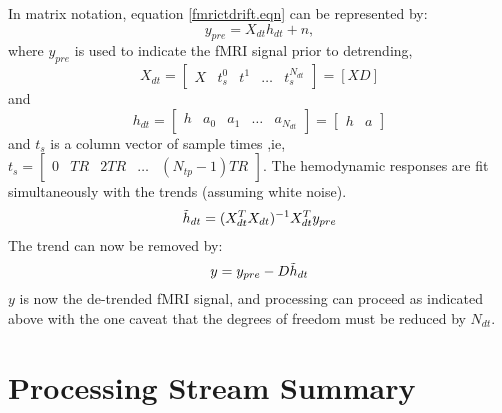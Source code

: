 \documentclass[12pt]{article}
\begin{document}
In matrix notation, equation \ref{fmrictdrift.eqn} can be represented
by:
\begin{equation}
y_{pre} = X_{dt} h_{dt} + n,
\end{equation}
where $y_{pre}$ is used to indicate the fMRI signal prior to
detrending, 
\begin{equation}
X_{dt} =  
\begin{bmatrix} X & t_s^0 & t^1 & \ldots & t_s^{N_{dt}} \end{bmatrix} 
= [X D]
\end{equation}
and
\begin{equation}
h_{dt} = \begin{bmatrix} h & a_0 & a_1 & \ldots &  a_{N_{dt}}
\end{bmatrix} = 
\begin{bmatrix}
h & a
\end{bmatrix}
\end{equation}
and $t_s$ is a column vector of sample times ,ie, 
$t_s = \begin{bmatrix}
  0 & TR & 2TR & \ldots & (N_{tp}-1)TR
\end{bmatrix}$.
The hemodynamic responses are fit
simultaneously with the trends (assuming white noise).
\begin{equation}
\Tilde{h}_{dt} = (X_{dt}^T X_{dt})^{-1} X_{dt}^T y_{pre} 
\end{equation}
The trend can now be removed by:
\begin{equation}
y = y_{pre} - D \Tilde{h}_{dt}
\label{detrend.eqn}
\end{equation}
$y$ is now the de-trended fMRI signal, and processing can proceed as
indicated above with the one caveat that the degrees of freedom must
be reduced by $N_{dt}$.

\section{Processing Stream Summary}
\end{document}

